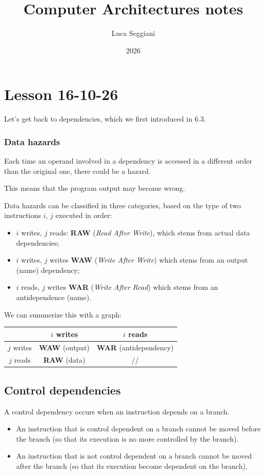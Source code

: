 \documentclass[a4paper,11pt]{article}
\title{Computer Architectures notes}
\author{Luca Seggiani}
\date{2026}
\begin{document}
\section{Lesson 16-10-26}

\thispagestyle{empty}
\pagestyle{fancy}

Let's get back to dependencies, which we first introduced in 6.3.

\subsubsection{Data hazards}
Each time an operand involved in a dependency is
accessed in a different order than the original one, there
could be a hazard.

This means that the program output may become wrong.

Data hazards can be classified in three categories, based on the type of two instructions $i$, $j$ executed in order:
\begin{itemize}
	\item $i$ writes, $j$ reads: \textbf{RAW} (\textit{Read After Write}), which stems from actual data dependencies;
	\item $i$ writes, $j$ writes \textbf{WAW} (\textit{Write After Write}) which stems from an output (name) dependency;
	\item $i$ reads, $j$ writes \textbf{WAR} (\textit{Write After Read}) which stems from an antidependence (name).
\end{itemize}

We can summerize this with a graph:
\begin{table}[h!]
	\centering
	\begin{tabular} { c || c | c }
		           & $i$ writes            & $i$ reads                     \\
		\hline\hline
		$j$ writes & \textbf{WAW} (output) & \textbf{WAR} (antidependency) \\
		\hline
		$j$ reads  & \textbf{RAW} (data)   & //                            \\
	\end{tabular}
\end{table}

\subsection{Control dependencies}

A control dependency occurs when an instruction depends on a branch.
\begin{itemize}
	\item
	      An instruction that is control dependent on a branch
	      cannot be moved before the branch (so that its
	      execution is no more controlled by the branch).
	\item
	      An instruction that is not control dependent on a
	      branch cannot be moved after the branch (so that its
	      execution become dependent on the branch).
\end{itemize}
\end{document}
